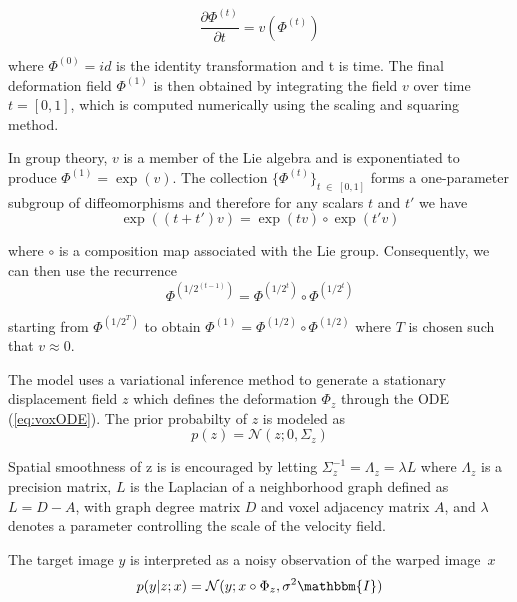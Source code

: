 \begin{equation} \label{eq:voxODE}
	\frac{\partial \Phi^{(t)}}{\partial t} = v(\Phi^{(t)})
\end{equation}

where $\Phi^{(0)} = id$ is the identity transformation and t is time.
The final deformation field $\Phi^{(1)}$ is then obtained by integrating the field $v$ over time $t = [0, 1]$, which is computed numerically using the scaling and squaring method.

In group theory, $v$ is a member of the Lie algebra and is exponentiated to produce $\Phi^{(1)} = \exp(v)$.
The collection $\{\Phi^{(t)}\}_{t \; \in \; [0,1]}$ forms a one-parameter subgroup of diffeomorphisms and therefore for any scalars $t$ and $t'$ we have 
\begin{equation} \label{eq:voxoneparamsubgroup}
	\exp((t + t')v) = \exp(tv) \circ \exp(t'v)
\end{equation}

where $\circ$ is a composition map associated with the Lie group. Consequently, we can then use the recurrence
\begin{equation} \label{eq:voxrecurrence}
	\Phi^{(1/2^{(t-1)})} = \Phi^{(1/2^{t})} \circ \Phi^{(1/2^{t})}
\end{equation}

starting from $\Phi^{(1/2^T)}$ to obtain $\Phi^{(1)} = \Phi^{(1/2)} \circ \Phi^{(1/2)}$ where $T$ is chosen such that $v \approx 0$.

The model uses a variational inference method to generate a stationary displacement field $z$ which defines the deformation $\Phi_z$ through the ODE (\ref{eq:voxODE}). The prior probabilty of $z$ is modeled as
\begin{equation}
	p(z) = \mathcal{N}(z; 0, \Sigma_z)
\end{equation}

Spatial smoothness of z is is encouraged by letting ${\Sigma_z^{-1} = \Lambda_z = \lambda L}$ where $\Lambda_z$ is a precision matrix, $L$ is the Laplacian of a neighborhood graph defined as $L = D - A$, with graph degree matrix $D$ and voxel adjacency matrix $A$, and $\lambda$ denotes a parameter controlling the scale of the velocity field.

The target image $y$ is interpreted as a noisy observation of the warped image~$x$
\begin{equation}
	p(y|z;x) = \mathcal{N}(y; x \circ \Phi_z, \sigma^2 \mathbbm{I})
\end{equation}

